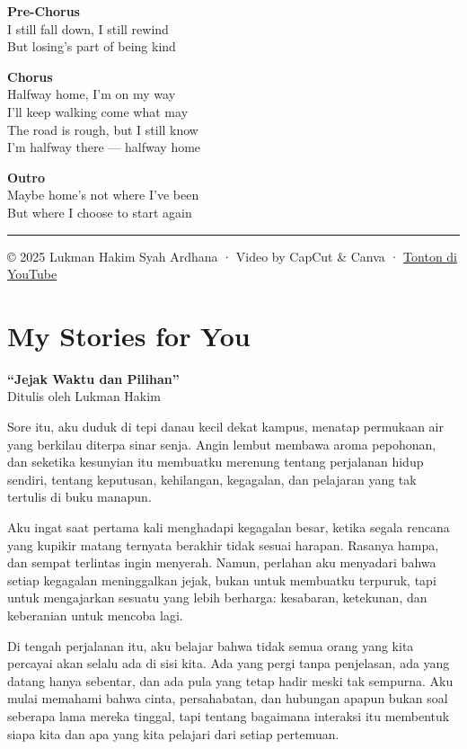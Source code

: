 \documentclass[
  letterpaper,
  DIV=11,
  numbers=noendperiod]{scrreprt}
\begin{document}
\textbf{Pre-Chorus}\\
I still fall down, I still rewind\\
But losing's part of being kind

\textbf{Chorus}\\
Halfway home, I'm on my way\\
I'll keep walking come what may\\
The road is rough, but I still know\\
I'm halfway there --- halfway home

\textbf{Outro}\\
Maybe home's not where I've been\\
But where I choose to start again

\begin{center}\rule{0.5\linewidth}{0.5pt}\end{center}

© 2025 Lukman Hakim Syah Ardhana · Video by CapCut \& Canva ·
\href{https://youtu.be/qKywgE79b1Q}{Tonton di YouTube}


\chapter{My Stories for You}\label{my-stories-for-you}

\textbf{``Jejak Waktu dan Pilihan''}\\
Ditulis oleh Lukman Hakim

Sore itu, aku duduk di tepi danau kecil dekat kampus, menatap permukaan
air yang berkilau diterpa sinar senja. Angin lembut membawa aroma
pepohonan, dan seketika kesunyian itu membuatku merenung tentang
perjalanan hidup sendiri, tentang keputusan, kehilangan, kegagalan, dan
pelajaran yang tak tertulis di buku manapun.

Aku ingat saat pertama kali menghadapi kegagalan besar, ketika segala
rencana yang kupikir matang ternyata berakhir tidak sesuai harapan.
Rasanya hampa, dan sempat terlintas ingin menyerah. Namun, perlahan aku
menyadari bahwa setiap kegagalan meninggalkan jejak, bukan untuk
membuatku terpuruk, tapi untuk mengajarkan sesuatu yang lebih berharga:
kesabaran, ketekunan, dan keberanian untuk mencoba lagi.

Di tengah perjalanan itu, aku belajar bahwa tidak semua orang yang kita
percayai akan selalu ada di sisi kita. Ada yang pergi tanpa penjelasan,
ada yang datang hanya sebentar, dan ada pula yang tetap hadir meski tak
sempurna. Aku mulai memahami bahwa cinta, persahabatan, dan hubungan
apapun bukan soal seberapa lama mereka tinggal, tapi tentang bagaimana
interaksi itu membentuk siapa kita dan apa yang kita pelajari dari
setiap pertemuan.
\end{document}
